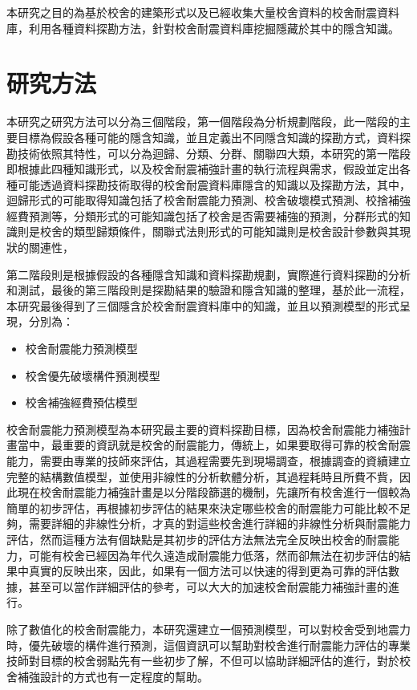 本研究之目的為基於校舍的建築形式以及已經收集大量校舍資料的校舍耐震資料庫，利用各種資料探勘方法，針對校舍耐震資料庫挖掘隱藏於其中的隱含知識。

\section{研究方法}

本研究之研究方法可以分為三個階段，第一個階段為分析規劃階段，此一階段的主要目標為假設各種可能的隱含知識，並且定義出不同隱含知識的探勘方式，資料探勘技術依照其特性，可以分為迴歸、分類、分群、關聯四大類，本研究的第一階段即根據此四種知識形式，以及校舍耐震補強計畫的執行流程與需求，假設並定出各種可能透過資料探勘技術取得的校舍耐震資料庫隱含的知識以及探勘方法，其中，迴歸形式的可能取得知識包括了校舍耐震能力預測、校舍破壞模式預測、校捨補強經費預測等，分類形式的可能知識包括了校舍是否需要補強的預測，分群形式的知識則是校舍的類型歸類條件，關聯式法則形式的可能知識則是校舍設計參數與其現狀的關連性，

第二階段則是根據假設的各種隱含知識和資料探勘規劃，實際進行資料探勘的分析和測試，最後的第三階段則是探勘結果的驗證和隱含知識的整理，基於此一流程，本研究最後得到了三個隱含於校舍耐震資料庫中的知識，並且以預測模型的形式呈現，分別為：

\begin{itemize}
\item 校舍耐震能力預測模型
\item 校舍優先破壞構件預測模型
\item 校舍補強經費預估模型
\end{itemize}

校舍耐震能力預測模型為本研究最主要的資料探勘目標，因為校舍耐震能力補強計畫當中，最重要的資訊就是校舍的耐震能力，傳統上，如果要取得可靠的校舍耐震能力，需要由專業的技師來評估，其過程需要先到現場調查，根據調查的資續建立完整的結構數值模型，並使用非線性的分析軟體分析，其過程耗時且所費不貲，因此現在校舍耐震能力補強計畫是以分階段篩選的機制，先讓所有校舍進行一個較為簡單的初步評估，再根據初步評估的結果來決定哪些校舍的耐震能力可能比較不足夠，需要詳細的非線性分析，才真的對這些校舍進行詳細的非線性分析與耐震能力評估，然而這種方法有個缺點是其初步的評估方法無法完全反映出校舍的耐震能力，可能有校舍已經因為年代久遠造成耐震能力低落，然而卻無法在初步評估的結果中真實的反映出來，因此，如果有一個方法可以快速的得到更為可靠的評估數據，甚至可以當作詳細評估的參考，可以大大的加速校舍耐震能力補強計畫的進行。

除了數值化的校舍耐震能力，本研究還建立一個預測模型，可以對校舍受到地震力時，優先破壞的構件進行預測，這個資訊可以幫助對校舍進行耐震能力評估的專業技師對目標的校舍弱點先有一些初步了解，不但可以協助詳細評估的進行，對於校舍補強設計的方式也有一定程度的幫助。

